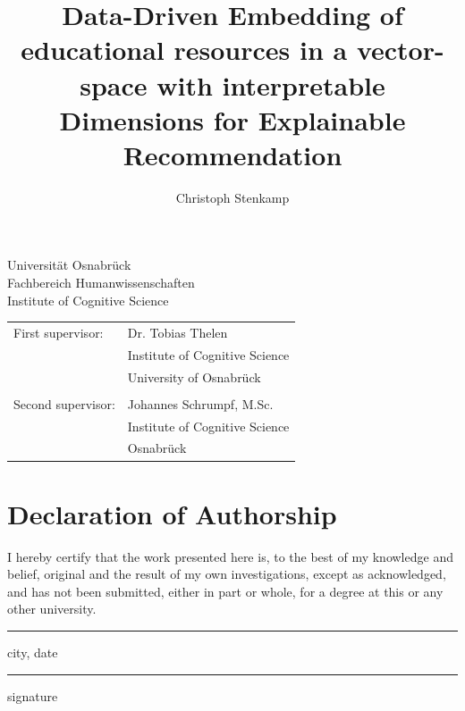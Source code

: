 \documentclass[11pt,
  paper=a4, 
  hidelinks,
  bibliography=totocnumbered,
	captions=tableheading,
	BCOR=10mm
]{scrreprt}
\title{Data-Driven Embedding of educational resources in a vector-space with interpretable Dimensions for Explainable Recommendation}
\author{Christoph Stenkamp}
\theoremstyle{definition}
\newcommand{\namesigdate}[1][5cm]{%
	\vspace{5cm}
	{\setlength{\parindent}{0cm}
	\begin{minipage}{0.3\textwidth}
		\hrule 
		\vspace{0.5cm}
		{\small city, date}
	\end{minipage}
	 \hfill
	\begin{minipage}{0.3\textwidth}
		\hrule
		\vspace{0.5cm}
	    {\small signature}
	\end{minipage}
	}
}
\begin{document}
\begin{titlepage}
	\begin{flushleft}
		Universität Osnabrück\\
		Fachbereich Humanwissenschaften\\
		Institute of Cognitive Science
	\end{flushleft}

	\vspace{2cm}
	\vspace{1cm}

	\begin{tabular}{ll}
		First supervisor:  & Dr. Tobias Thelen          \\
		                   & Institute of Cognitive Science \\
		                   & University of Osnabrück  \\\\
		Second supervisor: & Johannes Schrumpf, M.Sc.         \\
		                   & Institute of Cognitive Science \\
		                   & Osnabrück
	\end{tabular}

\end{titlepage}


\chapter*{Declaration of Authorship}
I hereby certify that the work presented here is, to the best of my knowledge and belief, original and the result of my own investigations, except as acknowledged, and has not been submitted, either in part or whole, for a degree at this or any other university.

\namesigdate
{}
\pagebreak
\end{document}

